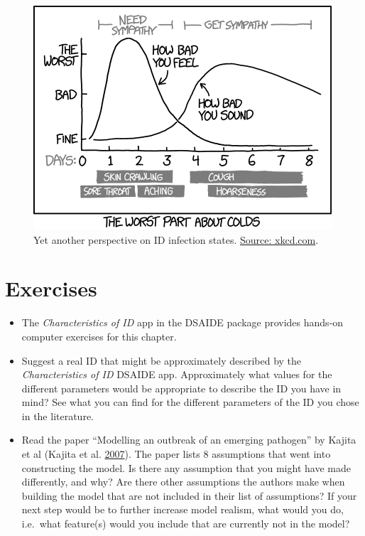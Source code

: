 \documentclass[]{book}
\providecommand{\tightlist}{%
  \setlength{\itemsep}{0pt}\setlength{\parskip}{0pt}}
\theoremstyle{definition}
\theoremstyle{definition}
\theoremstyle{definition}
\theoremstyle{remark}
\begin{document}
\begin{figure}
\centering
\includegraphics{./images/xkcd-course-of-colds.png}
\caption{\label{fig:coldcourse}Yet another perspective on ID infection
states. \href{https://xkcd.com/1612/}{Source: xkcd.com}.}
\end{figure}

\section{Exercises}\label{exercises-1}

\begin{itemize}
\tightlist
\item
  The \emph{Characteristics of ID} app in the DSAIDE package provides
  hands-on computer exercises for this chapter.
\item
  Suggest a real ID that might be approximately described by the
  \emph{Characteristics of ID} DSAIDE app. Approximately what values for
  the different parameters would be appropriate to describe the ID you
  have in mind? See what you can find for the different parameters of
  the ID you chose in the literature.
\item
  Read the paper ``Modelling an outbreak of an emerging pathogen'' by
  Kajita et al (Kajita et al. \protect\hyperlink{ref-kajita07}{2007}).
  The paper lists 8 assumptions that went into constructing the model.
  Is there any assumption that you might have made differently, and why?
  Are there other assumptions the authors make when building the model
  that are not included in their list of assumptions? If your next step
  would be to further increase model realism, what would you do,
  i.e.~what feature(s) would you include that are currently not in the
  model?
\end{itemize}
\end{document}
